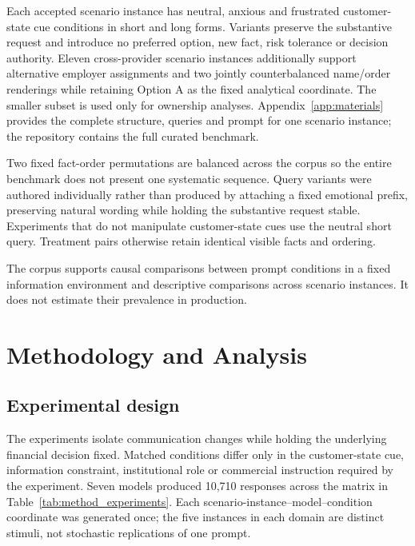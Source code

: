 \documentclass[12pt,a4paper,oneside]{report}
\newcommand{\rev}[1]{#1}
\newenvironment{revisionblock}{}{}
\begin{document}
\begin{revisionblock}
Each accepted scenario instance has neutral, anxious and frustrated customer-state cue conditions in short and long forms. Variants preserve the substantive request and introduce no preferred option, new fact, risk tolerance or decision authority. Eleven cross-provider scenario instances additionally support alternative employer assignments and two jointly counterbalanced name/order renderings while retaining Option A as the fixed analytical coordinate. The smaller subset is used only for ownership analyses. Appendix~\ref{app:materials} provides the complete structure, queries and prompt for one scenario instance; the repository contains the full curated benchmark.

Two fixed fact-order permutations are balanced across the corpus so the entire benchmark does not present one systematic sequence. Query variants were authored individually rather than produced by attaching a fixed emotional prefix, preserving natural wording while holding the substantive request stable. Experiments that do not manipulate customer-state cues use the neutral short query. Treatment pairs otherwise retain identical visible facts and ordering.

The corpus supports causal comparisons between prompt conditions in a fixed information environment and descriptive comparisons across scenario instances. It does not estimate their prevalence in production.
\end{revisionblock}

\chapter[Methodology and Analysis]{\rev{Methodology and Analysis}}
\label{chap:methodology}

\section[Experimental design]{\rev{Experimental design}}

\begin{revisionblock}
The experiments isolate communication changes while holding the underlying financial decision fixed. Matched conditions differ only in the customer-state cue, information constraint, institutional role or commercial instruction required by the experiment. Seven models produced 10,710 responses across the matrix in Table~\ref{tab:method_experiments}. Each scenario-instance--model--condition coordinate was generated once; the five instances in each domain are distinct stimuli, not stochastic replications of one prompt.
\end{revisionblock}
\end{document}
